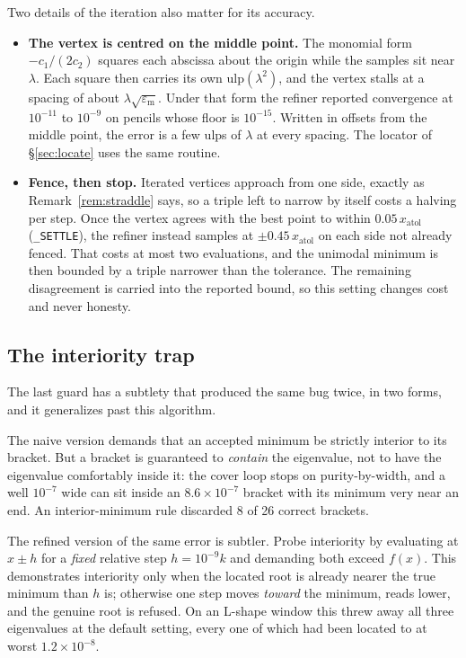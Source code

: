 \documentclass[11pt]{article}
\theoremstyle{definition}
\theoremstyle{remark}
\newcommand{\code}[1]{\texttt{#1}}
\newcommand{\lam}{\lambda}
\begin{document}
Two details of the iteration also matter for its accuracy.
\begin{itemize}
\item \textbf{The vertex is centred on the middle point.} The monomial form $-c_1/(2c_2)$
squares each abscissa about the origin while the samples sit near $\lam$. Each square then
carries its own $\mathrm{ulp}(\lam^2)$, and the vertex stalls at a spacing of about
$\lam\sqrt{\varepsilon_{\mathrm m}}$. Under that form the refiner reported convergence at
$10^{-11}$ to $10^{-9}$ on pencils whose floor is $10^{-15}$. Written in offsets from the middle
point, the error is a few ulps of $\lam$ at every spacing. The locator of \S\ref{sec:locate}
uses the same routine.
\item \textbf{Fence, then stop.} Iterated vertices approach from one side, exactly as
Remark~\ref{rem:straddle} says, so a triple left to narrow by itself costs a halving per step.
Once the vertex agrees with the best point to within $0.05\,x_{\text{atol}}$
(\code{\_SETTLE}), the refiner instead samples at $\pm0.45\,x_{\text{atol}}$ on each side not
already fenced. That costs at most two evaluations, and the unimodal minimum is then bounded by
a triple narrower than the tolerance. The remaining disagreement is carried into the reported
bound, so this setting changes cost and never honesty.
\end{itemize}

\subsection{The interiority trap}
\label{sec:interiority}

The last guard has a subtlety that produced the same bug twice, in two forms, and it
generalizes past this algorithm.

The naive version demands that an accepted minimum be strictly interior to its bracket. But a
bracket is guaranteed to \emph{contain} the eigenvalue, not to have the eigenvalue comfortably
inside it: the cover loop stops on purity-by-width, and a well $10^{-7}$ wide can sit inside an
$8.6\times10^{-7}$ bracket with its minimum very near an end. An interior-minimum rule discarded
8 of 26 correct brackets.

The refined version of the same error is subtler. Probe interiority by evaluating at
$x\pm h$ for a \emph{fixed} relative step $h=10^{-9}k$ and demanding both exceed $f(x)$. This
demonstrates interiority only when the located root is already nearer the true minimum than $h$
is; otherwise one step moves \emph{toward} the minimum, reads lower, and the genuine root is
refused. On an L-shape window this threw away all three eigenvalues at the default setting,
every one of which had been located to at worst $1.2\times10^{-8}$.
\end{document}
